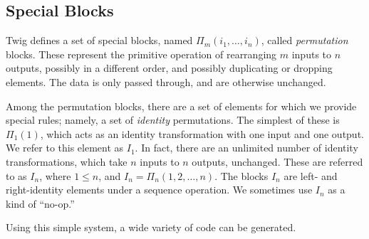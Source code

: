\subsection{Special Blocks}

Twig defines a set of special blocks, named $\Pi_m(i_1,\ldots,i_n)$, called
\emph{permutation} blocks. These represent the primitive operation of
rearranging $m$ inputs to $n$ outputs, possibly in a different order, and
possibly duplicating or dropping elements. The data is only passed through, and
are otherwise unchanged.

Among the permutation blocks, there are a set of elements for which we provide
special rules; namely, a set of \emph{identity} permutations. The simplest of
these is $\Pi_1(1)$, which acts as an identity transformation with one input and
one output. We refer to this element as $I_1$. In fact, there are an unlimited
number of identity transformations, which take $n$ inputs to $n$ outputs,
unchanged. These are referred to as $I_n$, where $1 \leq n$, and $I_n =
\Pi_n(1,2,\ldots,n)$. The blocks $I_n$ are left- and right-identity elements
under a sequence operation. We sometimes use $I_n$ as a kind of ``no-op.''

Using this simple system, a wide variety of code can be generated.
